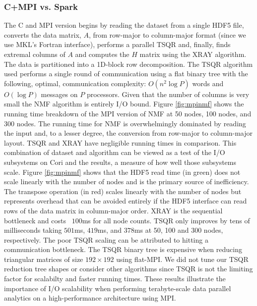\subsubsection{C+MPI vs. Spark}
The C and MPI version begins by reading the dataset from a single HDF5 file, converts the data matrix, $A$, from row-major to column-major format (since we use MKL's Fortran interface), performs a parallel TSQR and, finally, finds extremal columns of $A$ and computes the $H$ matrix using the XRAY algorithm. The data is partitioned into a 1D-block row decomposition. The TSQR algorithm used performs a single round of communication using a flat binary tree with the following, optimal, communication complexity: $O(n^2 \log P)$ words and $O(\log P)$ messages on $P$ processors. Given that the number of columns is very small the NMF algorithm is entirely I/O bound. Figure \ref{fig:mpinmf} shows the running time breakdown of the MPI version of NMF at 50 nodes, 100 nodes, and 300 nodes. The running time for NMF is overwhelmingly dominated by reading the input and, to a lesser degree, the conversion from row-major to column-major layout. TSQR and XRAY have negligible running times in comparison. This combination of dataset and algorithm can be viewed as a test of the I/O subsystems on Cori and the results, a measure of how well those subsystems scale. Figure \ref{fig:mpinmf} shows that the HDF5 read time (in green) does not scale linearly with the number of nodes and is the primary source of inefficiency. The transpose operation (in red) scales linearly with the number of nodes but represents overhead that can be avoided entirely if the HDF5 interface can read rows of the data matrix in column-major order. XRAY is the sequential bottleneck and costs ~$100$ms for all node counts. TSQR only improves by tens of milliseconds taking $501$ms, $419$ms, and $378$ms at 50, 100 and 300 nodes, respectively. The poor TSQR scaling can be attributed to hitting a communication bottleneck. The TSQR  binary tree is expensive when reducing triangular matrices of size $192 \times 192$ using flat-MPI. We did not tune our TSQR reduction tree shapes or consider other algorithms since TSQR is not the limiting factor for scalabilty and faster running times. These results illustrate the importance of I/O scalability when performing terabyte-scale data parallel analytics on a high-performance architecture using MPI.

